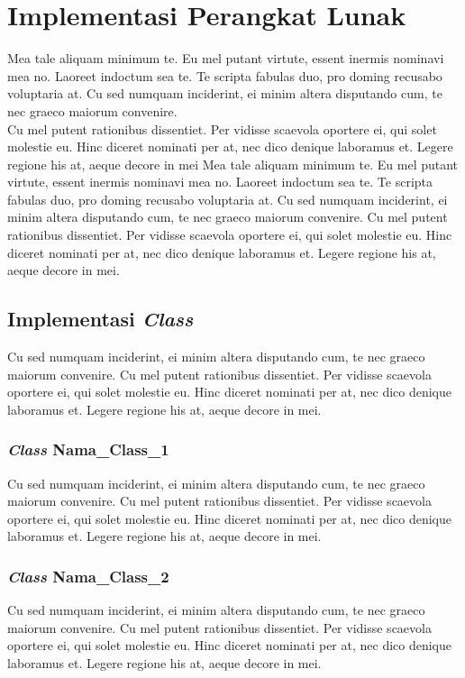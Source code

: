 \section{Implementasi Perangkat Lunak}
Mea tale aliquam minimum te. Eu mel putant virtute, essent inermis nominavi mea no. Laoreet indoctum sea te. Te scripta fabulas duo, pro doming recusabo voluptaria at. Cu sed numquam inciderint, ei minim altera disputando cum, te nec graeco maiorum convenire.\\
Cu mel putent rationibus dissentiet. Per vidisse scaevola oportere ei, qui solet molestie eu. Hinc diceret nominati per at, nec dico denique laboramus et. Legere regione his at, aeque decore in mei
Mea tale aliquam minimum te. Eu mel putant virtute, essent inermis nominavi mea no. Laoreet indoctum sea te. Te scripta fabulas duo, pro doming recusabo voluptaria at. Cu sed numquam inciderint, ei minim altera disputando cum, te nec graeco maiorum convenire.
Cu mel putent rationibus dissentiet. Per vidisse scaevola oportere ei, qui solet molestie eu. Hinc diceret nominati per at, nec dico denique laboramus et. Legere regione his at, aeque decore in mei.\\

\subsection{Implementasi \textit{Class}}
Cu sed numquam inciderint, ei minim altera disputando cum, te nec graeco maiorum convenire.
Cu mel putent rationibus dissentiet. Per vidisse scaevola oportere ei, qui solet molestie eu. Hinc diceret nominati per at, nec dico denique laboramus et. Legere regione his at, aeque decore in mei.\\

\subsubsection{\textit{Class} Nama\_Class\_1}
Cu sed numquam inciderint, ei minim altera disputando cum, te nec graeco maiorum convenire.
Cu mel putent rationibus dissentiet. Per vidisse scaevola oportere ei, qui solet molestie eu. Hinc diceret nominati per at, nec dico denique laboramus et. Legere regione his at, aeque decore in mei.\\

\subsubsection{\textit{Class} Nama\_Class\_2}
Cu sed numquam inciderint, ei minim altera disputando cum, te nec graeco maiorum convenire.
Cu mel putent rationibus dissentiet. Per vidisse scaevola oportere ei, qui solet molestie eu. Hinc diceret nominati per at, nec dico denique laboramus et. Legere regione his at, aeque decore in mei.\\

